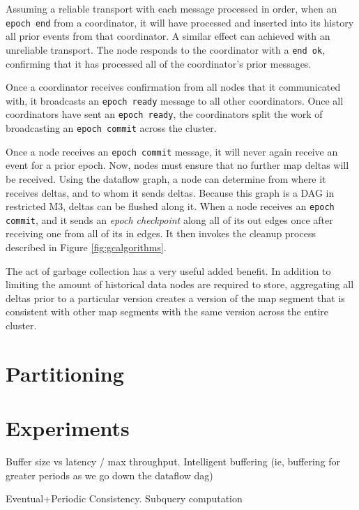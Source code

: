 \documentclass{vldb}
\begin{document}
Assuming a reliable transport with each message processed in order, when an \texttt{epoch end} from a coordinator, it will have processed and inserted into its history all prior events from that coordinator.  A similar effect can achieved with an unreliable transport.  The node responds to the coordinator with a \texttt{end ok}, confirming that it has processed all of the coordinator's prior messages.  

Once a coordinator receives confirmation from all nodes that it communicated with, it broadcasts an \texttt{epoch ready} message to all other coordinators.  Once all coordinators have sent an \texttt{epoch ready}, the coordinators split the work of broadcasting an \texttt{epoch commit} across the cluster.

Once a node receives an \texttt{epoch commit} message, it will never again receive an event for a prior epoch.  Now, nodes must ensure that no further map deltas will be received.  Using the dataflow graph, a node can determine from where it receives deltas, and to whom it sends deltas.  Because this graph is a DAG in restricted M3, deltas can be flushed along it.  When a node receives an \texttt{epoch commit}, and it sends an \textit{epoch checkpoint} along all of its out edges once after receiving one from all of its in edges.  It then invokes the cleanup process described in Figure \ref{fig:gcalgorithms}.

The act of garbage collection has a very useful added benefit.  In addition to limiting the amount of historical data nodes are required to store, aggregating all deltas prior to a particular version creates a version of the map segment that is consistent with other map segments with the same version across the entire cluster.

\section{Partitioning}
\label{sec:partitioning}

\section{Experiments}

Buffer size vs latency / max throughput.  Intelligent buffering (ie, buffering for greater periods as we go down the dataflow dag)


Eventual+Periodic Consistency.
Subquery computation

{\small


}
\end{document}
